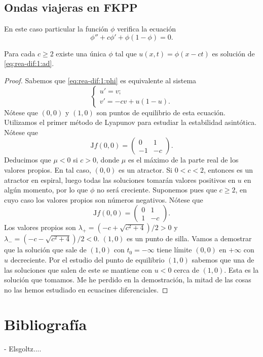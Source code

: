 \documentclass{article}
\begin{document}
\subsection{Ondas viajeras en FKPP}

En este caso particular la función $\phi$ verifica la ecuación
\begin{equation}
  \label{eq:rea-dif:1:phi}
  \phi'' + c \phi' + \phi(1-\phi) = 0.
\end{equation}

\begin{lemma}
  Para cada $c \ge 2$ existe una única $\phi$ tal que $u(x,t) = \phi(x-ct)$ es solución de
  \eqref{eq:rea-dif:1:ad}.
\end{lemma}
\begin{proof}
  Sabemos que \eqref{eq:rea-dif:1:phi} es equivalente al sistema
  \begin{equation}
    \label{eq:rea-dif:1:phi:s}
    \begin{cases}
      u' = v; \\
      v' = -c v + u (1-u).
    \end{cases}
  \end{equation}
  Nótese que $(0,0)$ y $(1,0)$ son puntos de equilibrio de esta ecuación. Utilizamos el primer
  método de Lyapunov para estudiar la estabilidad asintótica. Nótese que
  \[\mathrm{J}f(0,0) =\left(
      \begin{matrix}
        0 & 1 \\ -1 & -c
      \end{matrix}
    \right). \] Deducimos que $\mu < 0$ si $c > 0$, donde $\mu$ es el máximo de la parte real de los
  valores propios. En tal caso, $(0,0)$ es un atractor. Si $0 < c < 2$, entonces es un atractor en
  espiral, luego todas las soluciones tomarán valores positivos en $u$ en algún momento, por lo que
  $\phi$ no será creciente. Suponemos pues que $c \ge 2$, en cuyo caso los valores propios son
  números negativos. Nótese que
  \[\mathrm{J}f(0,0) =\left(
      \begin{matrix}
        0 & 1 \\ 1 & -c
      \end{matrix}
    \right). \] Los valores propios son $\lambda_+ = (-c + \sqrt{c^2 + 4})/ 2 > 0$ y
  $\lambda_- = (-c - \sqrt{c^2 + 4})/ 2 < 0$. $(1,0)$ es un punto de silla. Vamos a demostrar que la
  solución que sale de $(1,0)$ con $t_0 = -\infty$ tiene límite $(0,0)$ en $+\infty$ con $u$
  decreciente. Por el estudio del punto de equilibrio $(1,0)$ sabemos que una de las soluciones que
  salen de este se mantiene con $u < 0$ cerca de $(1,0)$. Esta es la solución que tomamos. Me he
  perdido en la demostración, la mitad de las cosas no las hemos estudiado en ecuacines
  diferenciales.
\end{proof}



\section{Bibliografía}

- Elsgoltz....
\end{document}
